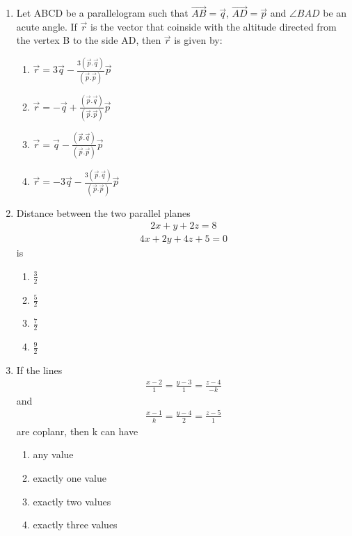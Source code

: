\begin{enumerate}[label=\arabic*.,ref=\thesubsection.\theenumi]
\item Let ABCD be a parallelogram such that $\overrightarrow{AB}=\overrightarrow{q}$, $\overrightarrow{AD}=\overrightarrow{p}$ and $\angle BAD$ be an acute angle. If $\overrightarrow{r}$ is the vector that coinside with the altitude directed from the vertex B to the side AD, then $\overrightarrow{r}$ is given by:
\begin{enumerate}
\item $\overrightarrow{r}=3\overrightarrow{q}-\frac{3(\overrightarrow{p}.\overrightarrow{q})}{(\overrightarrow{p}.\overrightarrow{p})}\overrightarrow{p}$
\item $\overrightarrow{r}=-\overrightarrow{q}+\frac{(\overrightarrow{p}.\overrightarrow{q})}{(\overrightarrow{p}.\overrightarrow{p})}\overrightarrow{p}$
\item $\overrightarrow{r}=\overrightarrow{q}-\frac{(\overrightarrow{p}.\overrightarrow{q})}{(\overrightarrow{p}.\overrightarrow{p})}\overrightarrow{p}$
\item $\overrightarrow{r}=-3\overrightarrow{q}-\frac{3(\overrightarrow{p}.\overrightarrow{q})}{(\overrightarrow{p}.\overrightarrow{p})}\overrightarrow{p}$
\end{enumerate}

\item Distance between the two parallel planes
\begin{align*}
2x+y+2z=8
\end{align*}
\begin{align*}
4x+2y+4z+5=0
\end{align*}
is
\begin{enumerate}
\item $\frac{3}{2}$
\item $\frac{5}{2}$
\item $\frac{7}{2}$
\item $\frac{9}{2}$
\end{enumerate}

\item If the lines 
\begin{align*}
\frac{x-2}{1}=\frac{y-3}{1}=\frac{z-4}{-k}
\end{align*}
and 
\begin{align*}
\frac{x-1}{k}=\frac{y-4}{2}=\frac{z-5}{1}
\end{align*}
are coplanr, then k can have
\begin{enumerate}
\item any value
\item exactly one value
\item exactly two values
\item exactly three values
\end{enumerate}


\end{enumerate}

